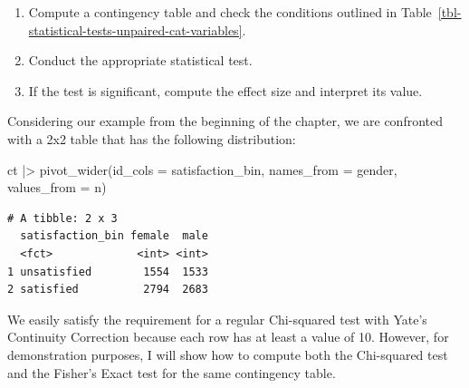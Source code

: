 \documentclass[
  letterpaper,
]{krantz}
\makeatletter
\newenvironment{Shaded}{\begin{snugshade}}{\end{snugshade}}
\newcommand{\AttributeTok}[1]{\textcolor[rgb]{0.40,0.45,0.13}{#1}}
\newcommand{\CommentTok}[1]{\textcolor[rgb]{0.37,0.37,0.37}{#1}}
\newcommand{\FunctionTok}[1]{\textcolor[rgb]{0.28,0.35,0.67}{#1}}
\newcommand{\NormalTok}[1]{\textcolor[rgb]{0.00,0.23,0.31}{#1}}
\newcommand{\SpecialCharTok}[1]{\textcolor[rgb]{0.37,0.37,0.37}{#1}}
\newenvironment{kframe}{%
\medskip{}
\setlength{\fboxsep}{.8em}
 \def\at@end@of@kframe{}%
 \ifinner\ifhmode%
  \def\at@end@of@kframe{\end{minipage}}%
  \begin{minipage}{\columnwidth}%
 \fi\fi%
 \def\FrameCommand##1{\hskip\@totalleftmargin \hskip-\fboxsep
 \colorbox{shadecolor}{##1}\hskip-\fboxsep
     \hskip-\linewidth \hskip-\@totalleftmargin \hskip\columnwidth}%
 \MakeFramed {\advance\hsize-\width
   \@totalleftmargin\z@ \linewidth\hsize
   \@setminipage}}%
 {\par\unskip\endMakeFramed%
 \at@end@of@kframe}
\renewenvironment{Shaded}{\begin{kframe}}{\end{kframe}}
\makeatother
\begin{document}
\begin{enumerate}
\def\labelenumi{\arabic{enumi}.}
\item
  Compute a contingency table and check the conditions outlined in
  Table~\ref{tbl-statistical-tests-unpaired-cat-variables}.
\item
  Conduct the appropriate statistical test.
\item
  If the test is significant, compute the effect size and interpret its
  value.
\end{enumerate}

Considering our example from the beginning of the chapter, we are
confronted with a 2x2 table that has the following distribution:

\begin{Shaded}
\begin{Highlighting}[]
\NormalTok{ct }\SpecialCharTok{|\textgreater{}} \FunctionTok{pivot\_wider}\NormalTok{(}\AttributeTok{id\_cols =}\NormalTok{ satisfaction\_bin,}
                   \AttributeTok{names\_from =}\NormalTok{ gender,}
                   \AttributeTok{values\_from =}\NormalTok{ n)}
\end{Highlighting}
\end{Shaded}

\begin{verbatim}
# A tibble: 2 x 3
  satisfaction_bin female  male
  <fct>             <int> <int>
1 unsatisfied        1554  1533
2 satisfied          2794  2683
\end{verbatim}

We easily satisfy the requirement for a regular Chi-squared test with
Yate's Continuity Correction because each row has at least a value of
10. However, for demonstration purposes, I will show how to compute both
the Chi-squared test and the Fisher's Exact test for the same
contingency table.

\begin{Shaded}
\end{Shaded}
\end{document}
